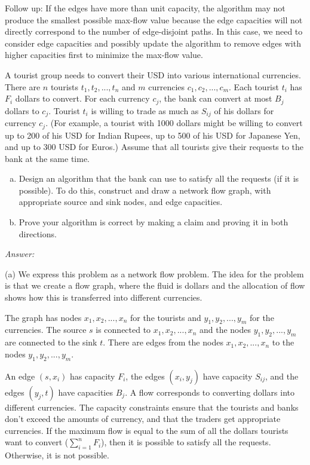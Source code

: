 \documentclass[12pt]{article}
\newenvironment{problem}[2][Problem]{\begin{trivlist}
\item[\hskip \labelsep {\bfseries #1}\hskip \labelsep {\bfseries #2.}]}{\end{trivlist}}
\begin{document}
Follow up: If the edges have more than unit capacity, the algorithm may not produce the smallest possible max-flow value because the edge capacities will not directly correspond to the number of edge-disjoint paths. In this case, we need to consider edge capacities and possibly update the algorithm to remove edges with higher capacities first to minimize the max-flow value.

\begin{problem}{4}
    A tourist group needs to convert their USD into various international currencies. There are $n$ tourists $t_1, t_2, ..., t_n$ and $m$ currencies $c_1, c_2, ..., c_m$. Each tourist $t_i$ has $F_i$ dollars to convert. For each currency $c_j$, the bank can convert at most $B_j$ dollars to $c_j$. Tourist $t_i$ is willing to trade as much as $S_{ij}$ of his dollars for currency $c_j$. (For example, a tourist with 1000 dollars might be willing to convert up to 200 of his USD for Indian Rupees, up to 500 of his USD for Japanese Yen, and up to 300 USD for Euros.) Assume that all tourists give their requests to the bank at the same time.
    \begin{enumerate}[(a)]
        \item Design an algorithm that the bank can use to satisfy all the requests (if it is possible). To do this, construct and draw a network flow graph, with appropriate source and sink nodes, and edge capacities.
        \item Prove your algorithm is correct by making a claim and proving it in both directions.
    \end{enumerate}
\end{problem}

\textit{Answer:}

(a) We express this problem as a network flow problem. The idea for the problem is that we create a flow graph, where the fluid is dollars and the allocation of flow shows how this is transferred into different currencies.

The graph has nodes $x_1, x_2, ..., x_n$ for the tourists and $y_1, y_2, ..., y_m$ for the currencies. The source $s$ is connected to $x_1, x_2, ..., x_n$ and the nodes $y_1, y_2, ..., y_m$ are connected to the sink $t$. There are edges from the nodes  $x_1, x_2, ..., x_n$ to the nodes $y_1, y_2, ..., y_m$.

An edge $(s, x_i)$ has capacity $F_i$, the edges $(x_i, y_j)$ have capacity $S_{ij}$, and the edges $(y_j, t)$ have capacities $B_j$. A flow corresponds to converting dollars into different currencies. The capacity constraints ensure that the tourists and banks don't exceed the amounts of currency, and that the traders get appropriate currencies. If the maximum flow is equal to the sum of all the dollars tourists want to convert ($\sum_{i=1}^{n} F_i$), then it is possible to satisfy all the requests. Otherwise, it is not possible.
\end{document}
